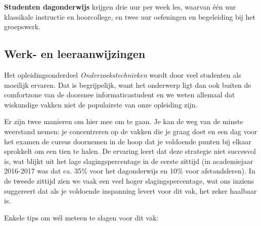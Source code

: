 \textbf{Studenten dagonderwijs} krijgen drie uur per week les, waarvan één uur klassikale instructie en hoorcollege, en twee uur oefeningen en begeleiding bij het groepswerk.

\subsection{Werk- en leeraanwijzingen}

Het opleidingsonderdeel \emph{Onderzoekstechnieken} wordt door veel studenten als moeilijk ervaren. Dat is begrijpelijk, want het onderwerp ligt dan ook buiten de comfortzone van de doorsnee informaticastudent en we weten allemaal dat wiskundige vakken niet de populairste van onze opleiding zijn.

Er zijn twee manieren om hier mee om te gaan. Je kan de weg van de minste weerstand nemen: je concentreren op de vakken die je graag doet en een dag voor het examen de cursus doornemen in de hoop dat je voldoende punten bij elkaar sprokkelt om een tien te halen. De ervaring leert dat deze strategie niet succesvol is, wat blijkt uit het lage slagingspercentage in de eerste zittijd (in academiejaar 2016-2017 was dat ca. 35\% voor het dagonderwijs en 10\% voor afstandsleren). In de tweede zittijd zien we vaak een veel hoger slagingspercentage, wat ons inziens suggereert dat als je voldoende inspanning levert voor dit vak, het zeker haalbaar is.

Enkele tips om wél meteen te slagen voor dit vak:

